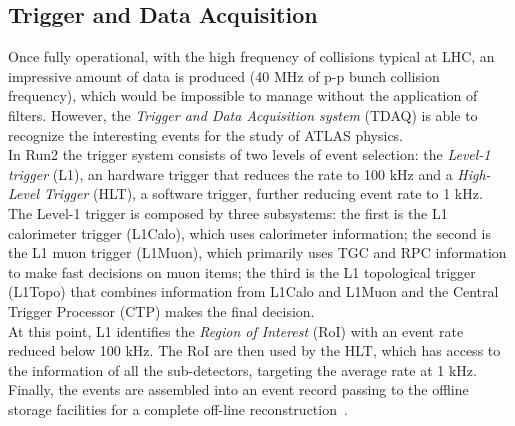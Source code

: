 \subsection{Trigger and Data Acquisition}
\label{sec:TrigSys}
Once fully operational, with the high frequency of collisions typical at LHC, an impressive amount of data is produced (40 MHz of p-p bunch collision frequency), 
which would be impossible to manage without the application of filters.
However, the \textit{Trigger and Data Acquisition system} (TDAQ) is able to recognize the interesting events for the study of ATLAS physics.\\
In Run2 the trigger system consists of two levels of event selection: the \textit{Level-1 trigger} (L1), an hardware trigger that reduces the rate to 100 kHz and a 
\textit{High-Level Trigger} (HLT), a software trigger, further reducing event rate to 1 kHz.\\
The Level-1 trigger is composed by three subsystems: 
the first is the L1 calorimeter trigger (L1Calo), which uses calorimeter information; 
the second is the L1 muon trigger (L1Muon), which primarily uses TGC and RPC information to make fast decisions on muon items; 
the third is the L1 topological trigger (L1Topo) that combines information from L1Calo and L1Muon and the Central Trigger Processor (CTP) makes the final decision.\\
At this point, L1 identifies the \textit{Region of Interest} (RoI) with an event rate reduced  below 100 kHz.
The RoI are then used by the HLT, which has access to the information of all the sub-detectors, targeting the average rate at 1 kHz.\\
Finally, the events are assembled into an event record passing to the offline storage facilities for a complete off-line reconstruction~\cite{TrigSys}.





